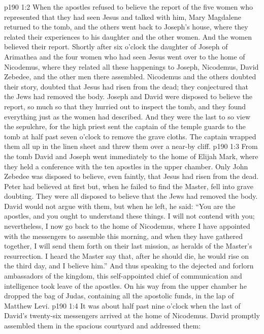 \vs p190 1:2 When the apostles refused to believe the report of the five women who represented that they had seen Jesus and talked with him, Mary Magdalene returned to the tomb, and the others went back to Joseph’s house, where they related their experiences to his daughter and the other women. And the women believed their report. Shortly after six o’clock the daughter of Joseph of Arimathea and the four women who had seen Jesus went over to the home of Nicodemus, where they related all these happenings to Joseph, Nicodemus, David Zebedee, and the other men there assembled. Nicodemus and the others doubted their story, doubted that Jesus had risen from the dead; they conjectured that the Jews had removed the body. Joseph and David were disposed to believe the report, so much so that they hurried out to inspect the tomb, and they found everything just as the women had described. And they were the last to so view the sepulchre, for the high priest sent the captain of the temple guards to the tomb at half past seven o’clock to remove the grave cloths. The captain wrapped them all up in the linen sheet and threw them over a near\hyp{}by cliff.
\vs p190 1:3 From the tomb David and Joseph went immediately to the home of Elijah Mark, where they held a conference with the ten apostles in the upper chamber. Only John Zebedee was disposed to believe, even faintly, that Jesus had risen from the dead. Peter had believed at first but, when he failed to find the Master, fell into grave doubting. They were all disposed to believe that the Jews had removed the body. David would not argue with them, but when he left, he said: “You are the apostles, and you ought to understand these things. I will not contend with you; nevertheless, I now go back to the home of Nicodemus, where I have appointed with the messengers to assemble this morning, and when they have gathered together, I will send them forth on their last mission, as heralds of the Master’s resurrection. I heard the Master say that, after he should die, he would rise on the third day, and I believe him.” And thus speaking to the dejected and forlorn ambassadors of the kingdom, this self\hyp{}appointed chief of communication and intelligence took leave of the apostles. On his way from the upper chamber he dropped the bag of Judas, containing all the apostolic funds, in the lap of Matthew Levi.
\vs p190 1:4 It was about half past nine o’clock when the last of David’s twenty\hyp{}six messengers arrived at the home of Nicodemus. David promptly assembled them in the spacious courtyard and addressed them:
